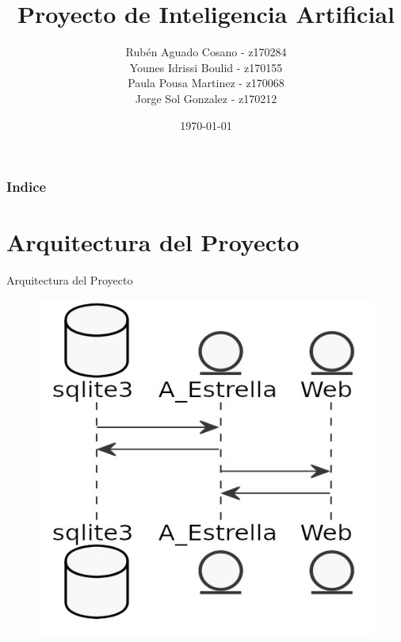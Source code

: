 \documentclass{beamer}
\title[Short title]{Proyecto de Inteligencia Artificial}
\author{Rubén Aguado Cosano - z170284 \\ Younes Idrissi Boulid - z170155 \\ Paula Pousa Martinez - z170068 \\ Jorge Sol Gonzalez - z170212}
\institute[ETSIINF UPM] 
{
  \textcolor{upmBlue}{Universidad Politecnica de Madrid}\\
\medskip
}
\date{\today}
\begin{document}
\begin{frame}
\titlepage
\end{frame}

\begin{frame}
\frametitle{Indice}
\tableofcontents
\end{frame}


\section{Arquitectura del Proyecto}
\begin{frame}{Arquitectura del Proyecto}
  \begin{figure}[H]
    \centering
    \includegraphics[scale=0.40]{"../pics/diagrama"}
  \end{figure}
\end{frame}
\end{document}
